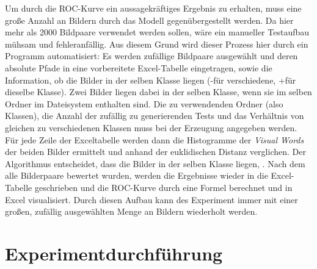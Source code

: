 Um durch die ROC-Kurve ein aussagekräftiges Ergebnis zu erhalten, muss eine große Anzahl an Bildern durch das Modell gegenübergestellt werden. Da hier mehr als 2000 Bildpaare verwendet werden sollen, wäre ein manueller Testaufbau mühsam und fehleranfällig. Aus diesem Grund wird dieser Prozess hier durch ein Programm automatisiert: Es werden zufällige Bildpaare ausgewählt und deren absolute Pfade in eine vorbereitete Excel-Tabelle eingetragen, sowie die Information, ob die Bilder in der selben Klasse liegen (\glqq -\grqq für verschiedene, \glqq +\grqq  für dieselbe Klasse). Zwei Bilder liegen dabei in der selben Klasse, wenn sie im selben Ordner im Dateisystem enthalten sind. Die zu verwendenden Ordner (also Klassen), die Anzahl der zufällig zu generierenden Tests und das Verhältnis von gleichen zu verschiedenen Klassen muss bei der Erzeugung angegeben werden. Für jede Zeile der Exceltabelle werden dann die Histogramme der \textit{Visual Words} der beiden Bilder ermittelt und anhand der euklidischen Distanz verglichen. Der Algorithmus entscheidet, dass die Bilder in der selben Klasse liegen, . Nach dem alle Bilderpaare bewertet wurden, werden die Ergebnisse wieder in die Excel-Tabelle geschrieben und die ROC-Kurve durch eine Formel berechnet und in Excel visualisiert. Durch diesen Aufbau kann des Experiment immer mit einer großen, zufällig ausgewählten Menge an Bildern wiederholt werden.

\section{Experimentdurchführung}